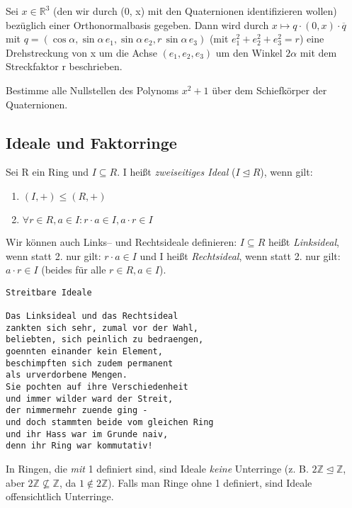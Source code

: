 \documentclass[10pt]{scrbook}
\begin{document}
\begin{Kor}
Sei $x\in \mathbb{R}^3$ (den wir durch (0, x) mit den Quaternionen identifizieren wollen) bezüglich einer Orthonormalbasis gegeben. Dann wird durch $x\mapsto q\cdot (0, x)\cdot \overline{q}$ mit 
$q=(\cos \alpha, \sin \alpha\,e_1, \sin \alpha\,e_2, r\,\sin \alpha\,e_3)$ (mit $e_1^2+e_2^2+e_3^2=r$) eine Drehstreckung von x um die Achse $(e_1, e_2, e_3)$ um den Winkel $2 \alpha$ mit dem Streckfaktor r beschrieben.
\end{Kor}

\begin{Auf}
Bestimme alle Nullstellen des Polynoms $x^2+1$ über dem Schiefkörper der Quaternionen.
\end{Auf}

\subsection{Ideale und Faktorringe}

\begin{Def}
Sei R ein Ring und $I \subseteq R$. I heißt \emph{zweiseitiges Ideal} ($I\trianglelefteq R$), wenn gilt:
\begin{enumerate}
	\item $(I, +)\leq (R, +)$
	\item $\forall r\in R, a\in I: r\cdot a\in I, a\cdot r\in I$
\end{enumerate}
\end{Def}

\begin{Bem}
Wir können auch Links-- und Rechtsideale definieren: $I \subseteq R$ heißt \emph{Linksideal}, wenn statt 2. nur gilt: $r\cdot a\in I$ und I heißt \emph{Rechtsideal}, wenn statt 2. nur gilt: $a\cdot r\in I$ (beides für alle $r\in R, a\in I$).
\end{Bem}

\begin{verbatim}
Streitbare Ideale

Das Linksideal und das Rechtsideal
zankten sich sehr, zumal vor der Wahl,
beliebten, sich peinlich zu bedraengen,
goennten einander kein Element,
beschimpften sich zudem permanent
als urverdorbene Mengen.
Sie pochten auf ihre Verschiedenheit
und immer wilder ward der Streit,
der nimmermehr zuende ging -
und doch stammten beide vom gleichen Ring
und ihr Hass war im Grunde naiv,
denn ihr Ring war kommutativ!
\end{verbatim}

\begin{Bem}
In Ringen, die \emph{mit} 1 definiert sind, sind Ideale \emph{keine} Unterringe (z. B. $2\mathbb{Z}\trianglelefteq \mathbb{Z}$, aber $2\mathbb{Z}\not\subseteq \mathbb{Z}$, da $1\notin 2\mathbb{Z}$). Falls man Ringe ohne 1 definiert, sind Ideale offensichtlich Unterringe.
\end{Bem}
\end{document}

